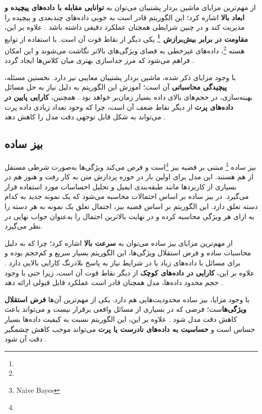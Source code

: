 از مهم‌ترین مزایای ماشین بردار پشتیبان می‌توان به \textbf{توانایی مقابله با داده‌های پیچیده و ابعاد بالا} اشاره کرد؛ این الگوریتم قادر است به خوبی داده‌های چندبعدی و پیچیده را مدیریت کند و در چنین شرایطی همچنان عملکرد دقیقی داشته باشد \cite{vapnik1998statistical}. علاوه بر این، \textbf{مقاومت در برابر بیش‌برازش \footnote{}} یکی دیگر از نقاط قوت آن است. با استفاده از توابع هسته \footnote{}، داده‌های غیرخطی به فضای ویژگی‌های بالاتر نگاشت می‌شوند و این امکان فراهم می‌شود که مرز جداسازی بهتری میان کلاس‌ها ایجاد گردد \cite{cortes1995support}. 

با وجود مزایای ذکر شده، ماشین بردار پشتیبان معایبی نیز دارد. نخستین مسئله، \textbf{پیچیدگی محاسباتی} آن است؛ آموزش این الگوریتم به دلیل نیاز به حل مسائل بهینه‌سازی، در حجم‌های بالای داده بسیار زمان‌بر خواهد بود \cite{murphy2012machine}. همچنین، \textbf{کارایی پایین در داده‌های پرت} از دیگر نقاط ضعف آن است، چرا که وجود تعداد زیادی داده پرت می‌تواند به شکل قابل توجهی دقت مدل را کاهش دهد \cite{bishop2006pattern}.



\subsection{بیز ساده}
بیز ساده \footnote{Naive Bayes} مبتنی بر قضیه بیز \footnote{}است و فرض می‌کند ویژگی‌ها به‌صورت شرطی مستقل از هم هستند\cite{domingos1997optimal,mitchell1997machine}.
این مدل برای اولین بار در حوزه پردازش متن به کار رفت و هنوز هم در بسیاری از کاربردها مانند طبقه‌بندی ایمیل و تحلیل احساسات مورد استفاده قرار می‌گیرد\cite{mccallum1998comparison}. 
در بیز ساده بر اساس احتمالات محاسبه می‌شود که یک نمونه جدید به کدام دسته تعلق دارد. این الگوریتم بر اساس قضیه بیز، احتمال تعلق یک نمونه به هر دسته را به ازای هر ویژگی محاسبه کرده و در نهایت بالاترین احتمال را به‌عنوان جواب نهایی در نظر می‌گیرد\cite{bishop2006pattern}.


از مهم‌ترین مزایای بیز ساده می‌توان به \textbf{سرعت بالا} اشاره کرد؛ چرا که به دلیل محاسبات ساده و فرض استقلال ویژگی‌ها، این الگوریتم بسیار سریع و کم‌حجم بوده و برای مسائل با داده‌های زیاد یا در شرایط نیاز به پاسخ بلادرنگ کارایی بالایی دارد \cite{mccallum1998comparison}. علاوه بر این، \textbf{کارایی در داده‌های کوچک} از دیگر نقاط قوت آن است، زیرا حتی با وجود حجم محدود داده‌ها، مدل همچنان قادر است عملکرد قابل قبولی ارائه دهد \cite{murphy2012machine}.  


با وجود مزایا، بیز ساده محدودیت‌هایی هم دارد. یکی از مهم‌ترین آن‌ها \textbf{فرض استقلال ویژگی‌ها}ست؛ فرضی که در بسیاری از مسائل واقعی برقرار نیست و می‌تواند باعث کاهش دقت مدل شود \cite{domingos1997optimal}. علاوه بر این، این الگوریتم نسبت به کیفیت داده‌ها بسیار حساس است و \textbf{حساسیت به داده‌های نادرست یا پرت} می‌تواند موجب کاهش چشمگیر دقت آن شود \cite{bishop2006pattern}.




